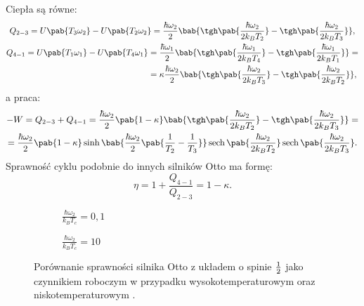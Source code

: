 Ciepła są równe:
\begin{gather}
	Q_{2-3} = U\pab{T_3\omega_2} - U\pab{T_2\omega_2} =
	\frac{\hbar\omega_2}{2} \bab{\tgh\pab{\frac{\hbar\omega_2}{2k_B T_2}} - \tgh\pab{\frac{\hbar\omega_2}{2k_B T_3}}}, \\
	\begin{split}
		Q_{4-1} = U\pab{T_1\omega_1} - U\pab{T_4\omega_1} &=
		\frac{\hbar\omega_1}{2} \bab{\tgh\pab{\frac{\hbar\omega_1}{2k_B T_4}} - \tgh\pab{\frac{\hbar\omega_1}{2k_B T_1}}} = \\ &=
		\kappa\frac{\hbar\omega_2}{2} \bab{\tgh\pab{\frac{\hbar\omega_2}{2k_B T_3}} - \tgh\pab{\frac{\hbar\omega_2}{2k_B T_2}}},
	\end{split}
\end{gather}
a praca:
\begin{multline}
	-W = Q_{2-3} + Q_{4-1} =
	\frac{\hbar\omega_2}{2}\pab{1-\kappa} \bab{\tgh\pab{\frac{\hbar\omega_2}{2k_B T_2}} - \tgh\pab{\frac{\hbar\omega_2}{2k_B T_3}}} = \\ =
	\frac{\hbar\omega_2}{2}\pab{1-\kappa}
	\sinh\bab{\frac{\hbar\omega_2}{2}\pab{\inv{T_2}-\inv{T_3}}}
	\sech\pab{\frac{\hbar\omega_2}{2k_B T_2}}
	\sech\pab{\frac{\hbar\omega_2}{2k_B T_3}}.
\end{multline}
Sprawność cyklu podobnie do innych silników Otto ma formę:
\begin{equation}
	\eta = 1 + \frac{Q_{4-1}}{Q_{2-3}} = 1 - \kappa.
\end{equation}

\begin{figure}[tp]
	\centering
	\begin{subfigure}{0.45\textwidth}
		\centering
		
		\caption{\(\frac{\hbar\omega_2}{k_B T_c} = 0,1\)}
		\label{fig:otto_spin_pol_PT_01}
	\end{subfigure}
	\begin{subfigure}{0.45\textwidth}
		\centering
		
		\caption{\(\frac{\hbar\omega_2}{k_B T_c} = 10\)}
		\label{fig:otto_spin_pol_PT_10}
	\end{subfigure}
	\captionsetup{subrefformat=parens}
	\caption{Porównanie sprawności silnika Otto z układem o spinie \(\frac{1}{2}\) jako czynnikiem roboczym w przypadku wysokotemperaturowym  oraz niskotemperaturowym .}
	\label{fig:otto_spin_pol_PT}
\end{figure}

